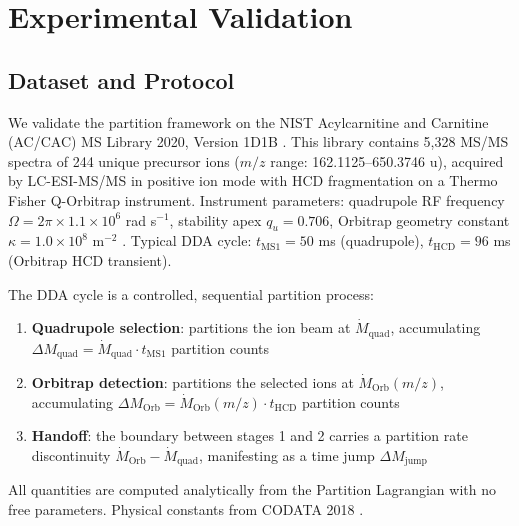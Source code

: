 
\section{Experimental Validation}
\label{sec:experiment}

\subsection{Dataset and Protocol}
\label{subsec:dataset}

We validate the partition framework on the NIST Acylcarnitine and Carnitine
(AC/CAC) MS Library 2020, Version 1D1B \cite{nist_accac_2020}. This library
contains 5,328 MS/MS spectra of 244 unique precursor ions ($m/z$ range:
162.1125--650.3746 u), acquired by LC-ESI-MS/MS in positive ion mode with HCD
fragmentation on a Thermo Fisher Q-Orbitrap instrument. Instrument parameters:
quadrupole RF frequency $\Omega = 2\pi \times 1.1 \times 10^6$ rad s$^{-1}$,
stability apex $q_u = 0.706$, Orbitrap geometry constant $\kappa = 1.0 \times
10^8$ m$^{-2}$ \cite{makarov2000}. Typical DDA cycle: $t_{\mathrm{MS1}} = 50$
ms (quadrupole), $t_{\mathrm{HCD}} = 96$ ms (Orbitrap HCD transient).

The DDA cycle is a controlled, sequential partition process:
\begin{enumerate}
    \item \textbf{Quadrupole selection}: partitions the ion beam at
          $\dot{M}_{\mathrm{quad}}$, accumulating $\Delta M_{\mathrm{quad}} =
          \dot{M}_{\mathrm{quad}} \cdot t_{\mathrm{MS1}}$ partition counts
    \item \textbf{Orbitrap detection}: partitions the selected ions at
          $\dot{M}_{\mathrm{Orb}}(m/z)$, accumulating $\Delta M_{\mathrm{Orb}}
          = \dot{M}_{\mathrm{Orb}}(m/z) \cdot t_{\mathrm{HCD}}$ partition counts
    \item \textbf{Handoff}: the boundary between stages 1 and 2 carries a
          partition rate discontinuity $\dot{M}_{\mathrm{Orb}} -
          \dot{M}_{\mathrm{quad}}$, manifesting as a time jump $\Delta
          M_{\mathrm{jump}}$
\end{enumerate}

All quantities are computed analytically from the Partition Lagrangian with no
free parameters. Physical constants from CODATA 2018 \cite{codata2018}.

